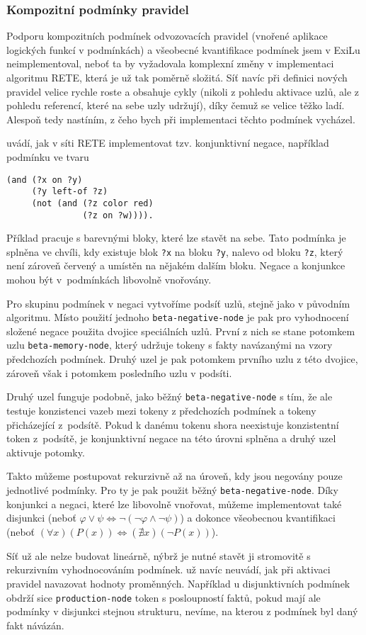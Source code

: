 \subsubsection{Kompozitní podmínky pravidel}
\label{composite conditions}

Podporu kompozitních podmínek odvozovacích pravidel (vnořené aplikace logických
funkcí v podmínkách) a všeobecné kvantifikace podmínek jsem v ExiLu
neimplementoval, neboť ta by vyžadovala komplexní změny v implementaci algoritmu
RETE, která je už tak poměrně složitá. Síť navíc při definici nových pravidel
velice rychle roste a obsahuje cykly (nikoli z pohledu aktivace uzlů, ale z
pohledu referencí, které na sebe uzly udržují), díky čemuž se velice těžko ladí.
Alespoň tedy nastíním, z čeho bych při implementaci těchto podmínek vycházel.

\cite{doorenbos} uvádí, jak v síti RETE implementovat tzv. konjunktivní negace,
například podmínku ve tvaru
\begin{verbatim}
(and (?x on ?y)
     (?y left-of ?z)
     (not (and (?z color red)
               (?z on ?w)))).
\end{verbatim}
Příklad pracuje s barevnými bloky, které lze stavět na sebe. Tato podmínka je
splněna ve chvíli, kdy existuje blok \verb|?x| na bloku \verb|?y|, nalevo od
bloku \verb|?z|, který není zároveň červený a umístěn na nějakém dalším bloku.
Negace a konjunkce mohou být v~podmínkách libovolně vnořovány.

Pro skupinu podmínek v negaci vytvoříme podsíť uzlů, stejně jako v původním
algoritmu. Místo použití jednoho \verb|beta-negative-node| je pak pro
vyhodnocení složené negace použita dvojice speciálních uzlů. První z nich se
stane potomkem uzlu \verb|beta-memory-node|, který udržuje tokeny s fakty
navázanými na vzory předchozích podmínek. Druhý uzel je pak potomkem prvního
uzlu z této dvojice, zároveň však i potomkem posledního uzlu v podsíti.

Druhý uzel funguje podobně, jako běžný \verb|beta-negative-node|
s tím, že ale testuje konzistenci vazeb mezi tokeny z předchozích podmínek a
tokeny přicházející z~podsítě. Pokud k danému tokenu shora neexistuje
konzistentní token z~podsítě, je konjunktivní negace na této úrovni splněna a
druhý uzel aktivuje potomky.

Takto můžeme postupovat rekurzivně až na úroveň, kdy jsou negovány pouze
jednotlivé podmínky. Pro ty je pak použit běžný \verb|beta-negative-node|. Díky
konjunkci a negaci, které lze libovolně vnořovat, můžeme implementovat také
disjunkci (neboť
$\varphi \lor \psi \Leftrightarrow \lnot(\lnot \varphi \land \lnot \psi)$)
a dokonce všeobecnou kvantifikaci
(neboť $(\forall x)(P(x)) \Leftrightarrow (\nexists x)(\lnot P(x))$).

Síť už ale nelze budovat lineárně, nýbrž je nutné stavět ji stromovitě s
rekurzivním vyhodnocováním podmínek. \cite{doorenbos} už navíc neuvádí, jak při
aktivaci pravidel navazovat hodnoty proměnných. Například u disjunktivních
podmínek obdrží sice \verb|production-node| token s posloupností faktů, pokud
mají ale podmínky v disjunkci stejnou strukturu, nevíme, na kterou z podmínek
byl daný fakt návázán.
